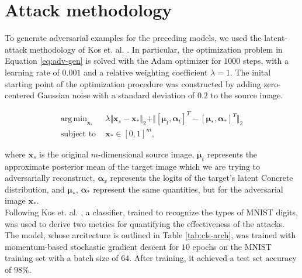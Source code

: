 \documentclass{report}
\DeclareMathOperator*{\argmin}{arg\,min}
\begin{document}
\section{Attack methodology}

\noindent To generate adversarial examples for the preceding models, we used the latent-attack methodology of Kos et. al. \cite{kos-gen-adv}. In particular, the optimization problem in Equation \ref{eq:adv-gen} is solved with the Adam optimizer for $1000$ steps, with a learning rate of $0.001$ and a relative weighting coefficient $\lambda = 1$. The inital starting point of the optimization procedure was constructed by adding zero-centered Gaussian noise with a standard deviation of $0.2$ to the source image.

\begin{equation}
\begin{aligned}
\argmin_{\boldsymbol{x}_{*}} \text{ } &\lambda \Vert \boldsymbol{x}_s - \boldsymbol{x}_{*} \Vert_2 + \Vert [\boldsymbol{\mu}_t, \boldsymbol{\alpha}_t]^T - [\boldsymbol{\mu}_{*}, \boldsymbol{\alpha}_{*}]^T \Vert_2 \\ 
\text{subject to } &\boldsymbol{x_{*}} \in [0, 1]^m,
\end{aligned}
\label{eq:adv-gen}
\end{equation}

\bigskip

\noindent where $\boldsymbol{x}_s$ is the original $m$-dimensional source image, $\boldsymbol{\mu}_t$ represents the approximate posterior mean of the target image which we are trying to adversarially reconstruct, $\boldsymbol{\alpha}_x$ represents the logits of the target's latent Concrete distribution, and $\boldsymbol{\mu}_*$, $\boldsymbol{\alpha}_*$ represent the same quantities, but for the adversarial image $\boldsymbol{x}_{*}$. \\

\noindent Following Kos et. al. \cite{kos-gen-adv}, a classifier, trained to recognize the types of MNIST digits, was used to derive two metrics for quantifying the effectiveness of the attacks. The model, whose arcitecture is outlined in Table \ref{tab:cls-arch}, was trained with momentum-based stochastic gradient descent for $10$ epochs on the MNIST training set with a batch size of $64$. After training, it achieved a test set accuracy of $98\%$. 
\end{document}
